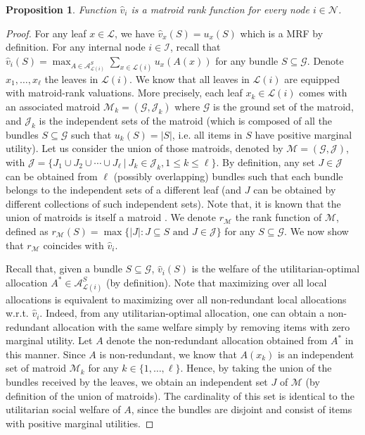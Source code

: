\documentclass[]{article}
\newtheorem{proposition}{Proposition}
\newcommand{\nodes}{\mathcal{N}}
\newcommand{\items}{\mathcal{G}}
\newcommand{\leaves}{\mathcal{L}}
\newcommand{\internal}{\mathcal{I}}
\newcommand{\allocations}{\mathcal{A}}
\begin{document}
\begin{proposition} \label{proposition: hat v MRF}
Function $\hat{v}_i$ is a matroid rank function for every node $i \in \nodes$.    
\end{proposition}

\begin{proof} For any leaf $x\in \leaves$, we have $\hat{v}_x(S)=u_x(S)$ which is a MRF by definition. For any internal node $i \in \internal$, recall that $\hat{v}_i(S) = \max_{A \in \allocations^S_{\leaves(i)}} \sum_{x \in \leaves(i)} u_x(A(x))$ for any bundle $S \subseteq \items$. Denote $x_1, \ldots, x_\ell$ the leaves in $\leaves(i)$. We know that all leaves in $\leaves(i)$ are equipped with matroid-rank valuations. More precisely, each leaf $x_k \in \leaves(i)$ comes with an associated matroid $\mathcal{M}_k = (\items, \mathcal{J}_k)$ where $\items$ is the ground set of the matroid, and $\mathcal{J}_k$ is the independent sets of the matroid (which is composed of all the bundles $S \subseteq \items$ such that $u_k(S)=|S|$, i.e. all items in $S$ have positive marginal utility).  
Let us consider the union of those matroids, denoted by $\mathcal{M} = (\items, \mathcal{J})$, with $\mathcal{J} = \{J_1 \cup J_2 \cup \cdots \cup J_\ell \ | \ J_k \in \mathcal{J}_k, 1 \leq k \leq \ell\}$. By definition, any set $J \in \mathcal{J}$ can be obtained from $\ell$ (possibly overlapping) bundles such that each bundle belongs to the independent sets of a different leaf  (and $J$ can be obtained by different collections of such independent sets). Note that, it is known that the union of matroids is itself a matroid \cite{NashWilliams1966}. We denote $r_{\mathcal{M}}$ the rank function of $\mathcal{M}$, defined as $r_{\mathcal{M}}(S) = \max\{|J| : J \subseteq S \mbox{ and }  J \in \mathcal{J}\}$ for any $S \subseteq \items$.
We now show that $r_{\mathcal{M}}$ coincides with $\hat{v}_i$.

Recall that, given a bundle $S \subseteq \items$, $\hat{v}_i(S)$ is the welfare of the utilitarian-optimal allocation $A^* \in \allocations^S_{\leaves(i)}$ (by definition). Note that maximizing over all local allocations is equivalent to maximizing over all non-redundant local allocations w.r.t. $\hat{v}_i$. Indeed, from any utilitarian-optimal allocation, one can obtain a non-redundant allocation with the same welfare simply by removing items with zero marginal utility. Let $A$ denote the non-redundant allocation obtained from $A^*$ in this manner. Since $A$
 is non-redundant, we know that $A(x_k)$ is an independent set of matroid $\mathcal{M}_k$ for any $k \in \{1, \ldots, \ell\}$. Hence, by taking the union of the bundles received by the leaves, we obtain an independent set $J$ of $\mathcal{M}$ (by definition of the union of matroids). The cardinality of this set is identical to the utilitarian social welfare of $A$, since the bundles are disjoint and consist of items with positive marginal utilities.


\end{proof}
\end{document}
